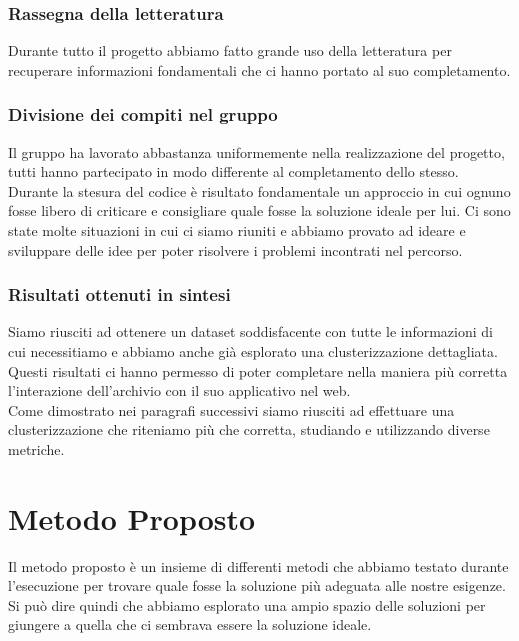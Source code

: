 \documentclass[12pt,a4paper,twoside]{article}
\begin{document}
\subsubsection{Rassegna della letteratura}
Durante tutto il progetto abbiamo fatto grande uso della letteratura per recuperare informazioni 
fondamentali che ci hanno portato al suo completamento.\\

\subsubsection{Divisione dei compiti nel gruppo}
Il gruppo ha lavorato abbastanza uniformemente nella realizzazione del progetto, tutti hanno 
partecipato in modo differente al completamento dello stesso.\\
Durante la stesura del codice è risultato fondamentale un approccio in cui ognuno fosse libero di 
criticare e consigliare quale fosse la soluzione ideale per lui. Ci sono state molte 
situazioni in cui ci siamo riuniti e abbiamo provato ad ideare e sviluppare delle idee per poter 
risolvere i problemi incontrati nel percorso.\\

\subsubsection{Risultati ottenuti in sintesi}
Siamo riusciti ad ottenere un dataset soddisfacente con tutte le informazioni di cui necessitiamo 
e abbiamo anche già esplorato una clusterizzazione dettagliata.\\
Questi risultati ci hanno permesso di poter completare nella maniera più corretta l'interazione 
dell'archivio con il suo applicativo nel web.\\
Come dimostrato nei paragrafi successivi siamo riusciti ad effettuare una clusterizzazione che 
riteniamo più che corretta, studiando e utilizzando diverse metriche.\\


\newpage
\section{Metodo Proposto}
Il metodo proposto è un insieme di differenti metodi che abbiamo testato durante l'esecuzione
per trovare quale fosse la soluzione più adeguata alle nostre esigenze.\\
Si può dire quindi che abbiamo esplorato una ampio spazio delle soluzioni per giungere a quella 
che ci sembrava essere la soluzione ideale.
\end{document}
